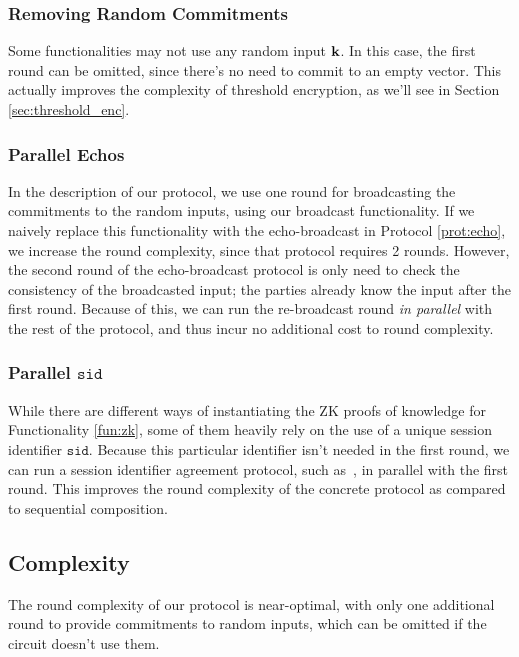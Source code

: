 \subsubsection{Removing Random Commitments}

Some functionalities may not use any random input $\textbf{k}$.
In this case, the first round can be omitted, since there's
no need to commit to an empty vector.
This actually improves the complexity of threshold encryption,
as we'll see in Section \ref{sec:threshold_enc}.

\subsubsection{Parallel Echos}

In the description of our protocol, we use one round for broadcasting
the commitments to the random inputs, using our broadcast functionality.
If we naively replace this functionality with the
echo-broadcast in Protocol \ref{prot:echo},
we increase the round complexity, since that protocol requires 2 rounds.
However, the second round of the echo-broadcast protocol is only
need to check the consistency of the broadcasted input; the parties
already know the input after the first round.
Because of this, we can run the re-broadcast round \emph{in parallel}
with the rest of the protocol, and thus incur no additional
cost to round complexity. 

\subsubsection{Parallel $\texttt{sid}$}

While there are different ways of instantiating the ZK proofs
of knowledge for Functionality \ref{fun:zk}, some of them
heavily rely on the use of a unique session identifier $\texttt{sid}$.
Because this particular identifier isn't needed in the first round,
we can run a session identifier agreement protocol,
such as~\cite{barak_protocol_2004}, in parallel with the first round.
This improves the round complexity of the concrete protocol as
compared to sequential composition.

\subsection{Complexity}

The round complexity of our protocol is near-optimal, with
only one additional round to provide commitments to random inputs,
which can be omitted if the circuit doesn't use them.

